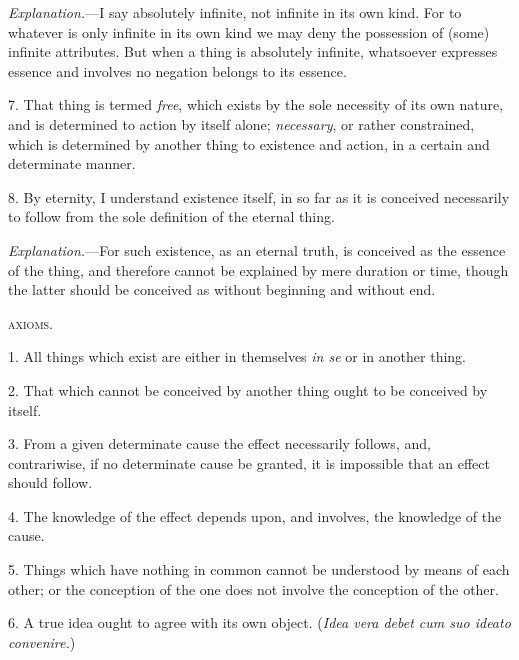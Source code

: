 \documentclass[oneside]{book}
\begin{document}
\emph{Explanation.}---I say absolutely infinite, not infinite in its
own kind. For to whatever is only infinite in its own kind we
may deny the possession of (some) infinite attributes. But when
a thing is absolutely infinite, whatsoever expresses essence and
involves no negation belongs to its essence.

7. That thing is termed \emph{free}, which exists by the sole necessity
of its own nature, and is determined to action by itself alone;
\emph{necessary}, or rather constrained, which is determined by another
thing to existence and action, in a certain and determinate manner.

8. By eternity, I understand existence itself, in so far as it is
conceived necessarily to follow from the sole definition of the
eternal thing.

\emph{Explanation.}---For such existence, as an eternal truth, is
conceived as the essence of the thing, and therefore cannot be explained
by mere duration or time, though the latter should be
conceived as without beginning and without end.

\begin{center}\textsc{axioms.}\end{center}

1. All things which exist are either in themselves \emph{in se} or
in another thing.

2. That which cannot be conceived by another thing ought
to be conceived by itself.

3. From a given determinate cause the effect necessarily follows, and,
contrariwise, if no determinate cause be granted, it is
impossible that an effect should follow.

4. The knowledge of the effect depends upon, and involves,
the knowledge of the cause.

5. Things which have nothing in common cannot be understood by means of
each other; or the conception of the one does
not involve the conception of the other.

6. A true idea ought to agree with its own object. (\emph{Idea
vera debet cum suo ideato convenire.})
\end{document}
